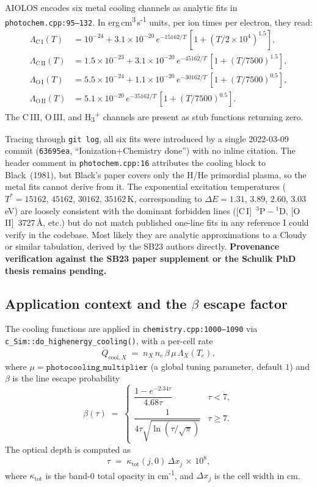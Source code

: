 \documentclass[english,a4paper]{kiseon_memo}
\begin{document}
AIOLOS encodes six metal cooling channels as analytic fits in
\texttt{photochem.cpp:95--132}.  In erg\,cm\textsuperscript{3}\,s\textsuperscript{-1}
units, per ion times per electron, they read:
\begin{align}
\Lambda_{\mathrm{C\,I}}(T)  &= 10^{-24} + 3.1\times10^{-20}\,e^{-15162/T}\,
                                \left[1 + (T/2\times10^{4})^{1.5}\right], \\
\Lambda_{\mathrm{C\,II}}(T) &= 1.5\times10^{-23} + 3.1\times10^{-20}\,e^{-45162/T}\,
                                \left[1 + (T/7500)^{1.5}\right], \\
\Lambda_{\mathrm{O\,I}}(T)  &= 5.5\times10^{-24} + 1.1\times10^{-20}\,e^{-30162/T}\,
                                \left[1 + (T/7500)^{0.5}\right], \\
\Lambda_{\mathrm{O\,II}}(T) &= 5.1\times10^{-20}\,e^{-35162/T}\,
                                \left[1 + (T/7500)^{0.5}\right].
\end{align}
The C\,III, O\,III, and H\textsubscript{3}\textsuperscript{+}
channels are present as stub functions returning zero.

Tracing through \texttt{git log}, all six fits were introduced by a single
2022-03-09 commit (\texttt{63695ea}, ``Ionization+Chemistry done'') with
no inline citation.  The header comment in \texttt{photochem.cpp:16}
attributes the cooling block to Black~(1981), but Black's paper covers
only the H/He primordial plasma, so the metal fits cannot derive from
it.  The exponential excitation temperatures
(\(T^\ast = 15162\), \(45162\), \(30162\), \(35162\)\,K, corresponding
to \(\Delta E = 1.31\), \(3.89\), \(2.60\), \(3.03\) eV) are
loosely consistent with the dominant forbidden lines
([C\,I]~\(\mathrm{^{3}P\!-\!^{1}D}\),
[O\,II]~3727\,\AA, etc.) but do not match published one-line fits
in any reference I could verify in the codebase.  Most likely they are
analytic approximations to a Cloudy or similar tabulation, derived by
the SB23 authors directly.  \textbf{Provenance verification against the
SB23 paper supplement or the Schulik PhD thesis remains pending.}

\subsection{Application context and the $\beta$ escape factor}

The cooling functions are applied in
\texttt{chemistry.cpp:1000--1090} via
\verb|c_Sim::do_highenergy_cooling()|, with a per-cell rate
\[
  \dot{Q}_{\mathrm{cool},X} \;=\; n_X\, n_e\, \beta\, \mu\, \Lambda_X(T_e),
\]
where \(\mu = \texttt{photocooling\_multiplier}\) (a global tuning
parameter, default \(1\)) and \(\beta\) is the line escape probability
\[
  \beta(\tau) \;=\;
  \begin{cases}
    \dfrac{1 - e^{-2.34\tau}}{4.68\tau} & \tau < 7,\\[6pt]
    \dfrac{1}{4\tau\sqrt{\ln(\tau/\sqrt{\pi})}} & \tau \ge 7.
  \end{cases}
\]
The optical depth is computed as
\[
  \tau \;=\; \kappa_{\mathrm{tot}}(j,0)\,\Delta x_j\,\times\,10^{8},
\]
where \(\kappa_{\mathrm{tot}}\) is the band-0 total opacity in
cm\textsuperscript{-1}, and \(\Delta x_j\) is the cell width in cm.
\end{document}
